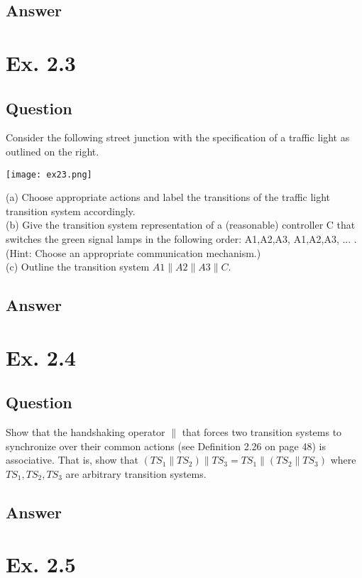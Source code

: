 \documentclass[12pt]{article}
\begin{document}
\subsection*{Answer}

\newpage
\section*{Ex. 2.3}
\subsection*{Question}
Consider the following street junction with the specification of a traffic light as
outlined on the right.\\
\begin{centering}
	\texttt{[image: ex23.png]}
\end{centering}
(a) Choose appropriate actions and label the transitions of the traffic light transition system
accordingly.\\
(b) Give the transition system representation of a (reasonable) controller C that switches the
green signal lamps in the following order: A1,A2,A3, A1,A2,A3, ... .\\
(Hint: Choose an appropriate communication mechanism.)\\
(c) Outline the transition system $A1\|A2\|A3\|C$.

\subsection*{Answer}

\newpage
\section*{Ex. 2.4}
\subsection*{Question}
Show that the handshaking operator $\|$ that forces two transition systems to
synchronize over their common actions (see Definition 2.26 on page 48) is associative. That is,
show that
$(TS_1\|TS_2)\|TS_3 = TS_1\|(TS_2\|TS_3)$
where $TS_1, TS_2, TS_3$ are arbitrary transition systems.

\subsection*{Answer}

\newpage
\section*{Ex. 2.5}
\end{document}
